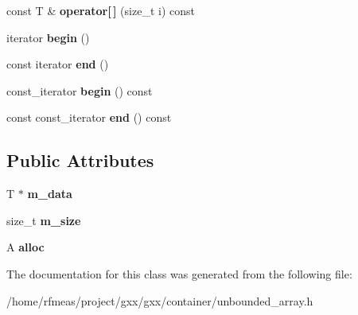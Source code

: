 \begin{DoxyCompactItemize}
\item 
const T \& {\bfseries operator\mbox{[}$\,$\mbox{]}} (size\+\_\+t i) const \hypertarget{classgxx_1_1unbounded__array_acb406af709fee7c4b1d18b738f47de1d}{}\label{classgxx_1_1unbounded__array_acb406af709fee7c4b1d18b738f47de1d}

\item 
iterator {\bfseries begin} ()\hypertarget{classgxx_1_1unbounded__array_a2a992176d31b0092eaf32cdc65d20d1a}{}\label{classgxx_1_1unbounded__array_a2a992176d31b0092eaf32cdc65d20d1a}

\item 
const iterator {\bfseries end} ()\hypertarget{classgxx_1_1unbounded__array_af225dae1f76d6244695be3f36da8e307}{}\label{classgxx_1_1unbounded__array_af225dae1f76d6244695be3f36da8e307}

\item 
const\+\_\+iterator {\bfseries begin} () const \hypertarget{classgxx_1_1unbounded__array_a2eb95b659e919b4bfbe4a774f7e58591}{}\label{classgxx_1_1unbounded__array_a2eb95b659e919b4bfbe4a774f7e58591}

\item 
const const\+\_\+iterator {\bfseries end} () const \hypertarget{classgxx_1_1unbounded__array_ad58123d4818cc9837d61aada49eb6697}{}\label{classgxx_1_1unbounded__array_ad58123d4818cc9837d61aada49eb6697}

\end{DoxyCompactItemize}
\subsection*{Public Attributes}
\begin{DoxyCompactItemize}
\item 
T $\ast$ {\bfseries m\+\_\+data}\hypertarget{classgxx_1_1unbounded__array_acec6bf1a63bc74885a7001d14ea72cb7}{}\label{classgxx_1_1unbounded__array_acec6bf1a63bc74885a7001d14ea72cb7}

\item 
size\+\_\+t {\bfseries m\+\_\+size}\hypertarget{classgxx_1_1unbounded__array_aa11e5e50779b5e9b63e578eda02d771b}{}\label{classgxx_1_1unbounded__array_aa11e5e50779b5e9b63e578eda02d771b}

\item 
A {\bfseries alloc}\hypertarget{classgxx_1_1unbounded__array_a07824235fb44824edd1d12bca3013f0c}{}\label{classgxx_1_1unbounded__array_a07824235fb44824edd1d12bca3013f0c}

\end{DoxyCompactItemize}


The documentation for this class was generated from the following file\+:\begin{DoxyCompactItemize}
\item 
/home/rfmeas/project/gxx/gxx/container/unbounded\+\_\+array.\+h\end{DoxyCompactItemize}
